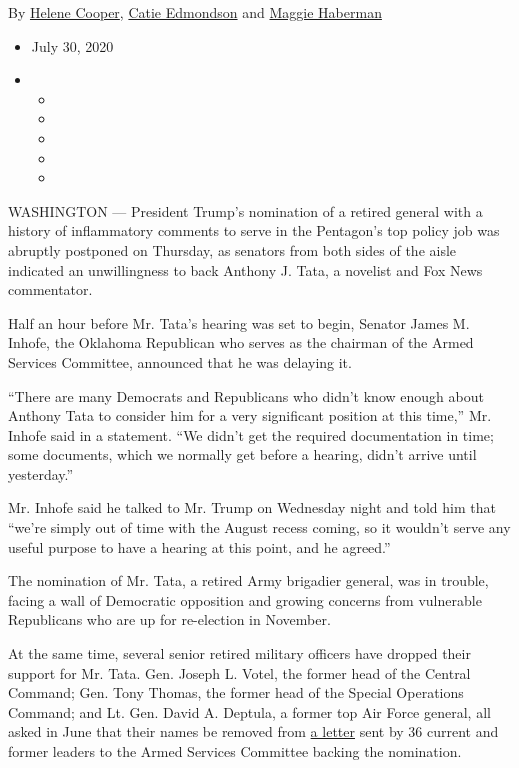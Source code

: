 By \href{https://www.nytimes3xbfgragh.onion/by/helene-cooper}{Helene
Cooper},
\href{https://www.nytimes3xbfgragh.onion/by/catie-edmondson}{Catie
Edmondson} and
\href{https://www.nytimes3xbfgragh.onion/by/maggie-haberman}{Maggie
Haberman}

\begin{itemize}
\item
  July 30, 2020
\item
  \begin{itemize}
  \item
  \item
  \item
  \item
  \item
  \end{itemize}
\end{itemize}

WASHINGTON --- President Trump's nomination of a retired general with a
history of inflammatory comments to serve in the Pentagon's top policy
job was abruptly postponed on Thursday, as senators from both sides of
the aisle indicated an unwillingness to back Anthony J. Tata, a novelist
and Fox News commentator.

Half an hour before Mr. Tata's hearing was set to begin, Senator James
M. Inhofe, the Oklahoma Republican who serves as the chairman of the
Armed Services Committee, announced that he was delaying it.

``There are many Democrats and Republicans who didn't know enough about
Anthony Tata to consider him for a very significant position at this
time,'' Mr. Inhofe said in a statement. ``We didn't get the required
documentation in time; some documents, which we normally get before a
hearing, didn't arrive until yesterday.''

Mr. Inhofe said he talked to Mr. Trump on Wednesday night and told him
that ``we're simply out of time with the August recess coming, so it
wouldn't serve any useful purpose to have a hearing at this point, and
he agreed.''

The nomination of Mr. Tata, a retired Army brigadier general, was in
trouble, facing a wall of Democratic opposition and growing concerns
from vulnerable Republicans who are up for re-election in November.

At the same time, several senior retired military officers have dropped
their support for Mr. Tata. Gen. Joseph L. Votel, the former head of the
Central Command; Gen. Tony Thomas, the former head of the Special
Operations Command; and Lt. Gen. David A. Deptula, a former top Air
Force general, all asked in June that their names be removed from
\href{https://s.wsj.net/public/resources/documents/Tata-Letter_06-18-2020.pdf}{a
letter} sent by 36 current and former leaders to the Armed Services
Committee backing the nomination.

